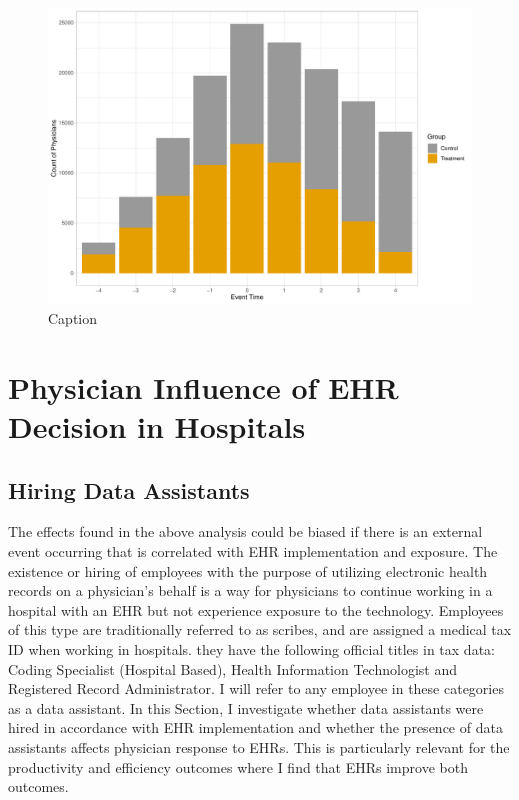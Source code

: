 \documentclass[12pt]{article}
\begin{document}
\begin{figure}
    \centering
    \includegraphics[scale=.5]{Objects/control_histogram.pdf}
    \caption{Caption}
    \label{fig:my_label}
\end{figure}


\section{Physician Influence of EHR Decision in Hospitals}

\subsection{Hiring Data Assistants}\label{sec:dataass}

The effects found in the above analysis could be biased if there is an external event occurring that is correlated with EHR implementation and exposure. The existence or hiring of employees with the purpose of utilizing electronic health records on a physician's behalf is a way for physicians to continue working in a hospital with an EHR but not experience exposure to the technology. Employees of this type are traditionally referred to as scribes, and are assigned a medical tax ID when working in hospitals. they have the following official titles in tax data: Coding Specialist (Hospital Based), Health Information Technologist and Registered Record Administrator. I will refer to any employee in these categories as a data assistant. In this Section, I investigate whether data assistants were hired in accordance with EHR implementation and whether the presence of data assistants affects physician response to EHRs. This is particularly relevant for the productivity and efficiency outcomes where I find that EHRs improve both outcomes.  
\end{document}

